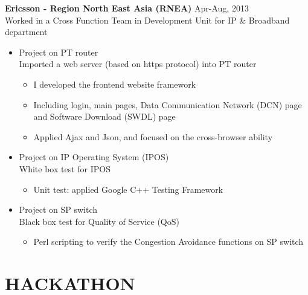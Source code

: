 \documentclass[line,margin]{res}
\begin{document}
\begin{resume}
{\bf Ericsson - Region North East Asia (RNEA)}
\hfill{\textcolor[rgb]{0.7,0.7,0.7}{Apr-Aug, 2013}}\\
Worked in a Cross Function Team in Development Unit for IP \& Broadband department

\begin{itemize}
\itemsep -2pt %

    \item Project on PT router\\
    Imported a web server (based on https protocol) into PT router\vspace{-6pt}
    \begin{itemize} \itemsep -2pt
        \item I developed the frontend website framework
        \item Including login, main pages, Data Communication Network (DCN) page and Software Download (SWDL) page
        \item Applied Ajax and Json, and focused on the cross-browser ability
    \end{itemize}
    
    \item Project on IP Operating System (IPOS)\\
    White box test for IPOS\vspace{-6pt}
    \begin{itemize}\itemsep -2pt %
        \item Unit test: applied Google C++ Testing Framework
    \end{itemize}
    
    \item Project on SP switch\\
    Black box test for Quality of Service (QoS)\vspace{-6pt}
    \begin{itemize}\itemsep -2pt %
        \item Perl scripting to verify the Congestion Avoidance functions on SP switch
    \end{itemize}

\end{itemize}

\section{HACKATHON} 
\renewcommand{\labelitemi}{-}


\end{resume}
\end{document}
